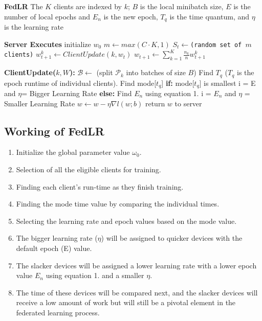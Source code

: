 \documentclass[conference]{IEEEtran}
\begin{document}
\begin{algorithm}[H]
	\scriptsize
	\caption{ \textbf{FedLR} The $K$ clients are
		indexed by $k$; $B$ is the local minibatch size, $E$ is the number
		of local epochs and $E_n$ is the new epoch, $T_q$ is the time quantum, and $\eta$ is the learning rate}\label{alg:cap}
	\begin{algorithmic}[1]
		
		\State \textbf{Server Executes}
		\State initialize $w_0$
		\State \texttt{$m \gets max(C\cdot K,1)$}
		\State \texttt{$S_t \gets $(random set of $m$ clients)}
		\State $w_{t+1}^{k} \gets ClientUpdate(k,w_t)$
		\EndFor
		\State $w_{t+1} \gets \sum_{k=1}^{K} \frac{n_k}{n} w_{t+1}^{k}$
		
		\EndFor
		\State \textbf{ClientUpdate($k,W$):} 
		\State $\mathcal{B} \gets$ (split $\mathcal{P}_k$ into batches of size $B$)
		\State Find $T_q$ ($T_q$ is the epoch runtime of individual clients).
		\State Find mode[$t_q$]
		\State \textbf{if:} mode[$t_q$] is smallest 
		\State \hspace{.3cm} i = E and $\eta$= Bigger Learning Rate
		\State \textbf{else:} 
		\State \hspace{.3cm} Find $E_n$ using equation 1. 
		\State \hspace{.3cm} i = $E_n$ and $\eta$ = Smaller Learning Rate
		\State $w \gets w - \eta \nabla l(w;b)$
		\EndFor
		\EndFor
		\State return $w$ to server
		
	\end{algorithmic}
\end{algorithm}
 

\subsection{Working of FedLR}
\begin{enumerate}
	\item Initialize the global parameter value $\omega_0$. 
	\item Selection of all the eligible clients for training.
	\item Finding each client's run-time as they finish training.
	\item Finding the mode time value by comparing the individual times.
	\item Selecting the learning rate and epoch values based on the mode value.
	\item The bigger learning rate ($\eta$) will be assigned to quicker devices with the default epoch (E) value. 
	\item The slacker devices will be assigned a lower learning rate with a lower epoch value $E_n$ using equation 1. and a smaller $\eta$.
	\item The time of these devices will be compared next, and the slacker devices will receive a low amount of work but will still be a pivotal element in the federated learning process.
\end{enumerate}
\end{document}
